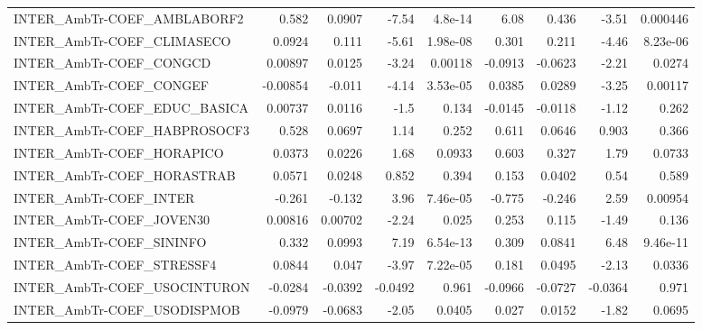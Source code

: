 \begin{tabular}{lrrrrrrrr}
INTER\_AmbTr-COEF\_AMBLABORF2            &       0.582 &       0.0907 &   -7.54 &  4.8e-14 &       6.08 &       0.436 &        -3.51 &      0.000446 \\
INTER\_AmbTr-COEF\_CLIMASECO             &      0.0924 &        0.111 &   -5.61 & 1.98e-08 &      0.301 &       0.211 &        -4.46 &      8.23e-06 \\
INTER\_AmbTr-COEF\_CONGCD                &     0.00897 &       0.0125 &   -3.24 &  0.00118 &    -0.0913 &     -0.0623 &        -2.21 &        0.0274 \\
INTER\_AmbTr-COEF\_CONGEF                &    -0.00854 &       -0.011 &   -4.14 & 3.53e-05 &     0.0385 &      0.0289 &        -3.25 &       0.00117 \\
INTER\_AmbTr-COEF\_EDUC\_BASICA           &     0.00737 &       0.0116 &    -1.5 &    0.134 &    -0.0145 &     -0.0118 &        -1.12 &         0.262 \\
INTER\_AmbTr-COEF\_HABPROSOCF3           &       0.528 &       0.0697 &    1.14 &    0.252 &      0.611 &      0.0646 &        0.903 &         0.366 \\
INTER\_AmbTr-COEF\_HORAPICO              &      0.0373 &       0.0226 &    1.68 &   0.0933 &      0.603 &       0.327 &         1.79 &        0.0733 \\
INTER\_AmbTr-COEF\_HORASTRAB             &      0.0571 &       0.0248 &   0.852 &    0.394 &      0.153 &      0.0402 &         0.54 &         0.589 \\
INTER\_AmbTr-COEF\_INTER                 &      -0.261 &       -0.132 &    3.96 & 7.46e-05 &     -0.775 &      -0.246 &         2.59 &       0.00954 \\
INTER\_AmbTr-COEF\_JOVEN30               &     0.00816 &      0.00702 &   -2.24 &    0.025 &      0.253 &       0.115 &        -1.49 &         0.136 \\
INTER\_AmbTr-COEF\_SININFO               &       0.332 &       0.0993 &    7.19 & 6.54e-13 &      0.309 &      0.0841 &         6.48 &      9.46e-11 \\
INTER\_AmbTr-COEF\_STRESSF4              &      0.0844 &        0.047 &   -3.97 & 7.22e-05 &      0.181 &      0.0495 &        -2.13 &        0.0336 \\
INTER\_AmbTr-COEF\_USOCINTURON           &     -0.0284 &      -0.0392 & -0.0492 &    0.961 &    -0.0966 &     -0.0727 &      -0.0364 &         0.971 \\
INTER\_AmbTr-COEF\_USODISPMOB            &     -0.0979 &      -0.0683 &   -2.05 &   0.0405 &      0.027 &      0.0152 &        -1.82 &        0.0695 \\

\end{tabular}
